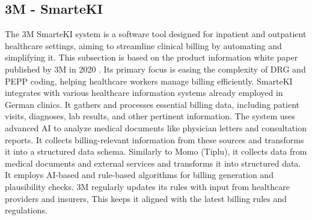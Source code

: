 \subsection{3M - SmarteKI}\label{subsec:3m---smarteki}
The 3M SmarteKI system is a software tool designed for inpatient and outpatient healthcare settings, aiming to streamline clinical billing by automating and simplifying it.
This subsection is based on the product information white paper published by 3M in 2020 \cite{3mSmarteKI}.
Its primary focus is easing the complexity of DRG and PEPP coding, helping healthcare workers manage billing efficiently.
SmarteKI integrates with various healthcare information systems already employed in German clinics.
It gathers and processes essential billing data, including patient visits, diagnoses, lab results, and other pertinent information.
The system uses advanced AI to analyze medical documents like physician letters and consultation reports.
It collects billing-relevant information from these sources and transforms it into a structured data schema.
Similarly to Momo (Tiplu), it collects data from medical documents and external services and transforms it into structured data.
It employs AI-based and rule-based algorithms for billing generation and plausibility checks.
3M regularly updates its rules with input from healthcare providers and insurers,
This keeps it aligned with the latest billing rules and regulations.
